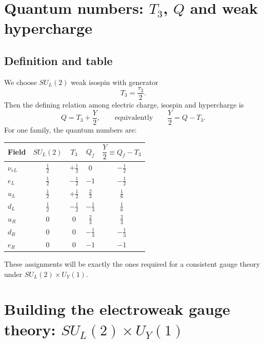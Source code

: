 \section{Quantum numbers: $T_3$, $Q$ and weak hypercharge}
\subsection{Definition and table}
We choose $SU_L(2)$ weak isospin with generator
\[
T_3=\frac{\tau_3}{2}.
\]
Then the defining relation among electric charge, isospin and hypercharge is
\begin{equation}
\boxed{
Q = T_3 + \frac{Y}{2},
\qquad\text{equivalently}\qquad
\frac{Y}{2}=Q-T_3.
}
\label{eq:Q-T3-Y}
\end{equation}
For one family, the quantum numbers are:

\begin{center}
\begin{tabular}{lcccc}
\hline
Field & $SU_L(2)$ & $T_3$ & $Q_f$ & $\dfrac{Y}{2}\equiv Q_f-T_3$ \\
\hline
$\nu_{eL}$ & $\frac{1}{2}$ & $+\frac{1}{2}$ & $0$ & $-\frac{1}{2}$ \\
$e_L$      & $\frac{1}{2}$ & $-\frac{1}{2}$ & $-1$ & $-\frac{1}{2}$ \\
\hline
$u_L$      & $\frac{1}{2}$ & $+\frac{1}{2}$ & $\frac{2}{3}$ & $\frac{1}{6}$ \\
$d_L$      & $\frac{1}{2}$ & $-\frac{1}{2}$ & $-\frac{1}{3}$ & $\frac{1}{6}$ \\
\hline
$u_R$      & $0$ & $0$ & $\frac{2}{3}$ & $\frac{2}{3}$ \\
$d_R$      & $0$ & $0$ & $-\frac{1}{3}$ & $-\frac{1}{3}$ \\
$e_R$      & $0$ & $0$ & $-1$ & $-1$ \\
\hline
\end{tabular}
\end{center}

\noindent
These assignments will be exactly the ones required for a consistent gauge theory under $SU_L(2)\times U_Y(1)$.

\section{Building the electroweak gauge theory: $SU_L(2)\times U_Y(1)$}
